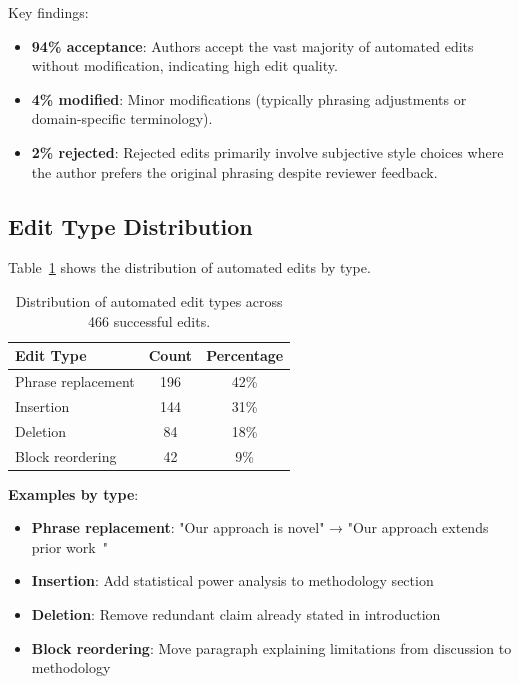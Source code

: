 Key findings:
\begin{itemize}
\item \textbf{94\% acceptance}: Authors accept the vast majority of automated edits without modification, indicating high edit quality.

\item \textbf{4\% modified}: Minor modifications (typically phrasing adjustments or domain-specific terminology).

\item \textbf{2\% rejected}: Rejected edits primarily involve subjective style choices where the author prefers the original phrasing despite reviewer feedback.
\end{itemize}

\subsection{Edit Type Distribution}

Table~\ref{tab:edit-types} shows the distribution of automated edits by type.

\begin{table}[t]
\centering
\caption{Distribution of automated edit types across 466 successful edits.}
\label{tab:edit-types}
\begin{tabular}{lcc}
\toprule
Edit Type & Count & Percentage \\
\midrule
Phrase replacement & 196 & 42\% \\
Insertion & 144 & 31\% \\
Deletion & 84 & 18\% \\
Block reordering & 42 & 9\% \\
\bottomrule
\end{tabular}
\end{table}

\textbf{Examples by type}:
\begin{itemize}
\item \textbf{Phrase replacement}: "Our approach is novel" → "Our approach extends prior work~\cite{smith2023}"
\item \textbf{Insertion}: Add statistical power analysis to methodology section
\item \textbf{Deletion}: Remove redundant claim already stated in introduction
\item \textbf{Block reordering}: Move paragraph explaining limitations from discussion to methodology
\end{itemize}

